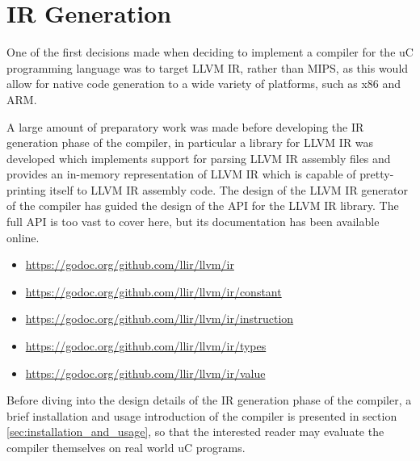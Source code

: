 
\section{IR Generation}
\label{sec:ir_generation}

One of the first decisions made when deciding to implement a compiler for the uC programming language was to target LLVM IR, rather than MIPS, as this would allow for native code generation to a wide variety of platforms, such as x86 and ARM.

A large amount of preparatory work was made before developing the IR generation phase of the compiler, in particular a library for LLVM IR was developed which implements support for parsing LLVM IR assembly files and provides an in-memory representation of LLVM IR which is capable of pretty-printing itself to LLVM IR assembly code. The design of the LLVM IR generator of the compiler has guided the design of the API for the LLVM IR library. The full API is too vast to cover here, but its documentation has been available online.

\begin{itemize}
	\item \url{https://godoc.org/github.com/llir/llvm/ir}
	\item \url{https://godoc.org/github.com/llir/llvm/ir/constant}
	\item \url{https://godoc.org/github.com/llir/llvm/ir/instruction}
	\item \url{https://godoc.org/github.com/llir/llvm/ir/types}
	\item \url{https://godoc.org/github.com/llir/llvm/ir/value}
\end{itemize}

Before diving into the design details of the IR generation phase of the compiler, a brief installation and usage introduction of the compiler is presented in section \ref{sec:installation_and_usage}, so that the interested reader may evaluate the compiler themselves on real world uC programs.






